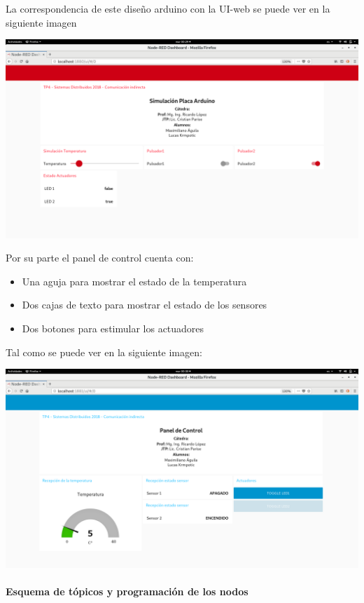 \documentclass[11pt]{article}
\makeatletter
\def\maxwidth{\ifdim\Gin@nat@width>\linewidth\linewidth
    \else\Gin@nat@width\fi}
\let\Oldincludegraphics\includegraphics
\renewcommand{\includegraphics}[1]{\Oldincludegraphics[width=.8\maxwidth]{#1}}
\makeatother
\begin{document}
    La correspondencia de este diseño arduino con la UI-web se puede ver en
la siguiente imagen

    \includegraphics{images/simulacion-placa.png}

    Por su parte el panel de control cuenta con:

\begin{itemize}
\item
  Una aguja para mostrar el estado de la temperatura
\item
  Dos cajas de texto para mostrar el estado de los sensores
\item
  Dos botones para estimular los actuadores
\end{itemize}

Tal como se puede ver en la siguiente imagen:

    \includegraphics{images/panel-control.png}

    \hypertarget{esquema-de-tuxf3picos-y-programaciuxf3n-de-los-nodos}{%
\paragraph{Esquema de tópicos y programación de los
nodos}\label{esquema-de-tuxf3picos-y-programaciuxf3n-de-los-nodos}}
\end{document}
